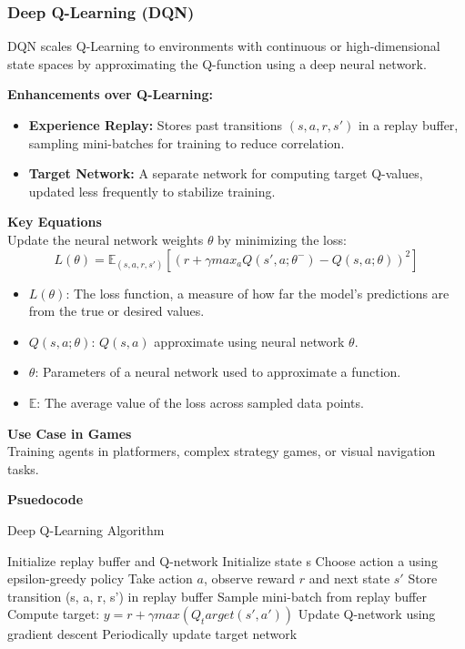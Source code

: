 \documentclass[12pt,oneside,openright,a4paper]{cpe-english-project}
\begin{document}
\subsubsection{Deep Q-Learning (DQN)}\cite{pytorch_dqn_tutorial}
DQN scales Q-Learning to environments with continuous or high-dimensional state spaces by approximating the Q-function using a deep neural network.\par
\textbf{Enhancements over Q-Learning:}
\begin{itemize}
\item  \textbf{Experience Replay:} Stores past transitions $(s,a,r,s')$ in a replay buffer, sampling mini-batches for training to reduce correlation.
\item  \textbf{Target Network:}  A separate network for computing target Q-values, updated less frequently to stabilize training.
\end{itemize}
\textbf{Key Equations} \\
Update the neural network weights $\theta$ by minimizing the loss:
\begin{equation}
L(\theta) = 	\mathbb{E}_{(s,a,r,s')}[(r + \gamma max_{a}Q(s',a;\theta^-)-Q(s,a;\theta))^2]
\end{equation}
\begin{itemize}
\item $L(\theta)$: The loss function, a measure of how far the model's predictions are from the true or desired values.
\item $Q(s,a;\theta)$: $Q(s,a)$ approximate using neural network $\theta$.
\item $\theta$: Parameters of a neural network used to approximate a function.
\item $\mathbb{E}$: The average value of the loss across sampled data points.
\end{itemize}
\textbf{Use Case in Games} \\
Training agents in platformers, complex strategy games, or visual navigation tasks.\par
\textbf{Psuedocode}
\begin{algorithm}
\caption{Deep Q-Learning Algorithm}\label{alg:DQLA}
\begin{algorithmic}
\State Initialize replay buffer and Q-network
\State Initialize state s
	\State Choose action a using epsilon-greedy policy
	\State Take action $a$, observe reward $r$ and next state $s'$	
	\State Store transition (s, a, r, s') in replay buffer
	\State Sample mini-batch from replay buffer
	\State Compute target: $y = r + \gamma max(Q_target(s', a'))$
	\State Update Q-network using gradient descent
	\State Periodically update target network
\EndWhile
\EndFor
\end{algorithmic}
\end{algorithm}
\end{document}
